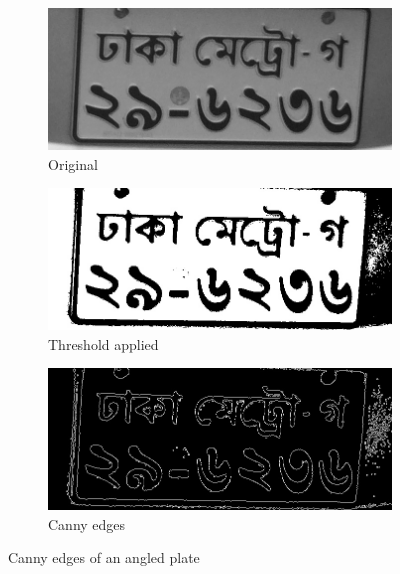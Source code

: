 \begin{figure}
\begin{subfigure}{0.33\textwidth}
    \centering
    \includegraphics[width=0.9\linewidth]{./img/experiment/stage.9/00-angle2}
    \caption{Original}
\end{subfigure}
\begin{subfigure}{0.33\textwidth}
    \centering
    \includegraphics[width=0.9\linewidth]{./img/experiment/stage.10/00-angle2}
    \caption{Threshold applied}
\end{subfigure}
\begin{subfigure}{0.33\textwidth}
    \centering
    \includegraphics[width=0.9\linewidth]{./img/experiment/stage.11/00-angle2}
    \caption{Canny edges}
\end{subfigure}
\caption{Canny edges of an angled plate}
\label{fig:CannyResult2}
\end{figure}

